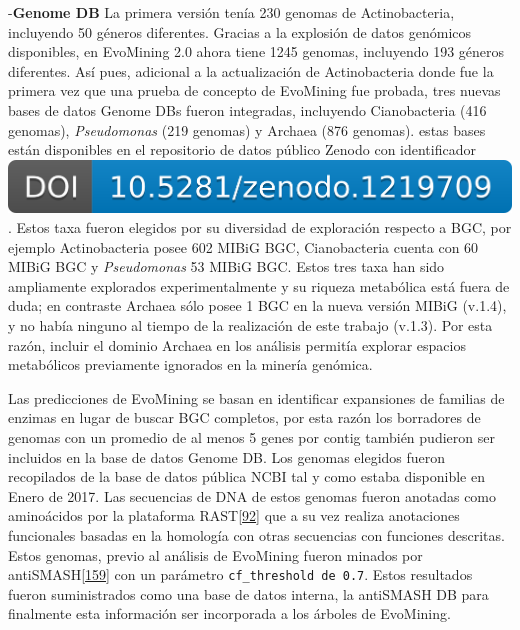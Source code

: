 \documentclass[12pt,twoside]{reedthesis}
\begin{document}
  -\textbf{Genome DB} La primera versión tenía 230 genomas de
  Actinobacteria, incluyendo 50 géneros diferentes. Gracias a la explosión
  de datos genómicos disponibles, en EvoMining 2.0 ahora tiene 1245
  genomas, incluyendo 193 géneros diferentes. Así pues, adicional a la
  actualización de Actinobacteria donde fue la primera vez que una prueba
  de concepto de EvoMining fue probada, tres nuevas bases de datos Genome
  DBs fueron integradas, incluyendo Cianobacteria (416 genomas),
  \emph{Pseudomonas} (219 genomas) y Archaea (876 genomas). estas bases
  están disponibles en el repositorio de datos público Zenodo con
  identificador
  \href{https://doi.org/10.5281/zenodo.1219709}{\includegraphics{chapter2/zenodo_1219709.png}}.
  Estos taxa fueron elegidos por su diversidad de exploración respecto a
  BGC, por ejemplo Actinobacteria posee 602 MIBiG BGC, Cianobacteria
  cuenta con 60 MIBiG BGC y \emph{Pseudomonas} 53 MIBiG BGC. Estos tres
  taxa han sido ampliamente explorados experimentalmente y su riqueza
  metabólica está fuera de duda; en contraste Archaea sólo posee 1 BGC en
  la nueva versión MIBiG (v.1.4), y no había ninguno al tiempo de la
  realización de este trabajo (v.1.3). Por esta razón, incluir el dominio
  Archaea en los análisis permitía explorar espacios metabólicos
  previamente ignorados en la minería genómica.
  
  Las predicciones de EvoMining se basan en identificar expansiones de
  familias de enzimas en lugar de buscar BGC completos, por esta razón los
  borradores de genomas con un promedio de al menos 5 genes por contig
  también pudieron ser incluidos en la base de datos Genome DB. Los
  genomas elegidos fueron recopilados de la base de datos pública NCBI tal
  y como estaba disponible en Enero de 2017. Las secuencias de DNA de
  estos genomas fueron anotadas como aminoácidos por la plataforma
  RAST{[}\protect\hyperlink{ref-overbeek_seed_2014}{92}{]} que a su vez
  realiza anotaciones funcionales basadas en la homología con otras
  secuencias con funciones descritas. Estos genomas, previo al análisis de
  EvoMining fueron minados por
  antiSMASH{[}\protect\hyperlink{ref-weber_antismash3_2015}{159}{]} con un
  parámetro \texttt{cf\_threshold\ de\ 0.7}. Estos resultados fueron
  suministrados como una base de datos interna, la antiSMASH DB para
  finalmente esta información ser incorporada a los árboles de EvoMining.
  
\end{document}
